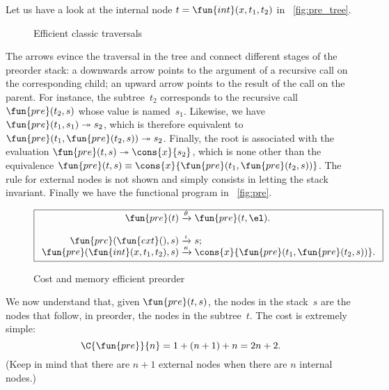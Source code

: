 Let us have a look at the internal node
\(t=\fun{int}(x,t_1,t_2)\) in \fig~\vref{fig:pre_tree}.
\begin{figure}
\centering
{}
\caption{Efficient classic traversals}
\label{fig:classic_walks}
\end{figure}
The arrows evince the traversal in the tree and connect different
stages of the preorder stack: a downwards arrow points to the argument
of a recursive call on the corresponding child; an upward arrow points
to the result of the call on the parent. For instance, the
subtree~\(t_2\) corresponds to the recursive call
\(\fun{pre}(t_2,s)\) whose value is
named~\(s_1\). Likewise, we have \(\fun{pre}(t_1,s_1)
\twoheadrightarrow s_2\), which is therefore equivalent to
\(\fun{pre}(t_1,\fun{pre}(t_2,s)) \twoheadrightarrow s_2\). Finally,
the root is associated with the evaluation \(\fun{pre}(t,s)
\twoheadrightarrow \cons{x}{s_2}\), which is none other than the
equivalence \(\fun{pre}(t,s) \equiv
\cons{x}{\fun{pre}(t_1,\fun{pre}(t_2,s))}\).
The rule for external nodes is not shown and simply consists in
letting the stack invariant. Finally we have the functional
program in \fig~\vref{fig:pre}.
\begin{figure}[h]
\begin{equation*}
\boxed{
\begin{array}{r@{\;}c@{\;}l}
\fun{pre}(t) & \xrightarrow{\smash{\theta}} & \fun{pre}(t,\el).\\
\\
\fun{pre}(\fun{ext}(),s) & \xrightarrow{\smash{\iota}} & s;\\
\fun{pre}(\fun{int}(x,t_1,t_2),s)
  & \xrightarrow{\smash{\kappa}}
  & \cons{x}{\fun{pre}(t_1,\fun{pre}(t_2,s))}.
\end{array}}
\end{equation*}
\caption{Cost and memory efficient preorder}
\label{fig:pre}
\end{figure}

We now understand that, given \(\fun{pre}(t,s)\), the nodes in the
stack~\(s\) are the nodes that follow, in preorder, the nodes in the
subtree~\(t\). The cost is extremely simple:
\begin{equation}
\C{\fun{pre}}{n} = 1 + (n+1) + n = 2n+2.\label{eq:pre}
\index{pre@$\C{\fun{pre}}{n}$}
\end{equation}
(Keep in mind that there are \(n+1\) external nodes when there are
\(n\) internal nodes.)

